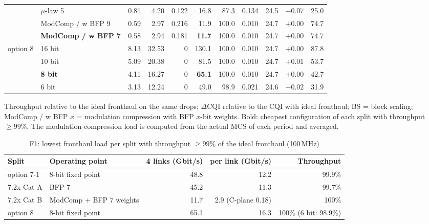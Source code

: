 \documentclass[11pt,a4paper]{article}
\begin{document}
\begin{table}[H]
{\begin{tabular}{@{}l l r r r r r r r r r@{}}
                            & $\mu$-law 5 & 0.81 & 4.20 & 0.122 & 16.8 & 87.3 & 0.134 & 24.5 & $-0.07$ & 25.0 \\
                            & ModComp / w BFP 9 & 0.59 & 2.97 & 0.216 & 11.9 & 100.0 & 0.010 & 24.7 & $+0.00$ & 74.7 \\
                            & \textbf{ModComp / w BFP 7} & 0.58 & 2.94 & 0.181 & \textbf{11.7} & 100.0 & 0.010 & 24.7 & $+0.00$ & 74.7 \\
\midrule
\multirow{4}{*}{option 8}   & 16 bit & 8.13 & 32.53 & 0     & 130.1 & 100.0 & 0.010 & 24.7 & $+0.00$ & 87.8 \\
                            & 10 bit & 5.09 & 20.38 & 0     & 81.5  & 100.0 & 0.010 & 24.7 & $+0.01$ & 53.7 \\
                            & \textbf{8 bit}  & 4.11 & 16.27 & 0     & \textbf{65.1}  & 100.0 & 0.010 & 24.7 & $+0.00$ & 42.7 \\
                            & 6 bit  & 3.13 & 12.24 & 0     & 49.0  & 98.9  & 0.021 & 24.6 & $-0.02$ & 31.9 \\
\bottomrule
\end{tabular}}

\smallskip
\parbox{\textwidth}{\footnotesize Throughput relative to the ideal fronthaul on the same drops; $\Delta$CQI relative to the CQI with
ideal fronthaul; BS = block scaling; ModComp / w BFP $x$ = modulation compression with BFP $x$-bit weights. Bold: cheapest
configuration of each split with throughput $\ge 99\%$. The modulation-compression load is computed from the actual MCS of each
period and averaged.}
\end{table}

\begin{table}[H]
\centering
\caption{F1: lowest fronthaul load per split with throughput $\ge 99\%$ of the ideal fronthaul (100\,MHz)}
\label{tab:f1best}
\footnotesize
\begin{tabular}{@{}l l r r r@{}}
\toprule
Split & Operating point & 4 links (Gbit/s) & per link (Gbit/s) & Throughput \\
\midrule
option 7-1 & 8-bit fixed point                   & 48.8 & 12.2 & 99.9\% \\
7.2x Cat A & BFP 7                                       & 45.2 & 11.3 & 99.7\% \\
7.2x Cat B & ModComp + BFP 7 weights      & 11.7 & 2.9 (C-plane 0.18) & 100\% \\
option 8   & 8-bit fixed point                   & 65.1 & 16.3 & 100\% (6 bit: 98.9\%) \\
\bottomrule
\end{tabular}
\end{table}
\end{document}
